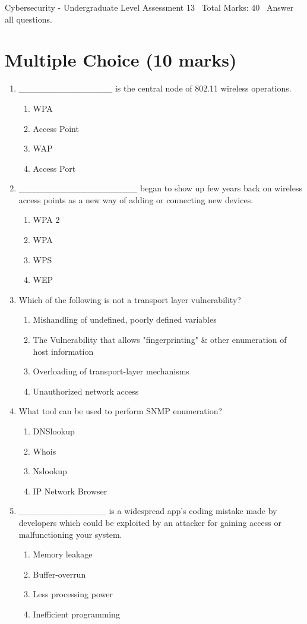 \documentclass[12pt]{article}
\begin{document}
\begin{center}
Cybersecurity - Undergraduate Level Assessment 13 \
Total Marks: 40 \
Answer all questions.
\end{center}

\section*{Multiple Choice (10 marks)}
\begin{enumerate}[label=\arabic*.]
\item \_\_\_\_\_\_\_\_\_\_\_\_\_\_\_ is the central node of 802.11 wireless operations.
\begin{enumerate}[label=(\alph*)]
    \item WPA
    \item Access Point
    \item WAP
    \item Access Port
\end{enumerate}
\item \_\_\_\_\_\_\_\_\_\_\_\_\_\_\_\_\_\_\_ began to show up few years back on wireless access points as a new way of adding or connecting new devices.
\begin{enumerate}[label=(\alph*)]
    \item WPA 2
    \item WPA
    \item WPS
    \item WEP
\end{enumerate}
\item Which of the following is not a transport layer vulnerability?
\begin{enumerate}[label=(\alph*)]
    \item Mishandling of undefined, poorly defined variables
    \item The Vulnerability that allows "fingerprinting" \& other enumeration of host information
    \item Overloading of transport-layer mechanisms
    \item Unauthorized network access
\end{enumerate}
\item What tool can be used to perform SNMP enumeration?
\begin{enumerate}[label=(\alph*)]
    \item DNSlookup
    \item Whois
    \item Nslookup
    \item IP Network Browser
\end{enumerate}
\item \_\_\_\_\_\_\_\_\_\_\_\_\_\_ is a widespread app's coding mistake made by developers which could be exploited by an attacker for gaining access or malfunctioning your system.
\begin{enumerate}[label=(\alph*)]
    \item Memory leakage
    \item Buffer-overrun
    \item Less processing power
    \item Inefficient programming
\end{enumerate}
\end{enumerate}
\end{document}
